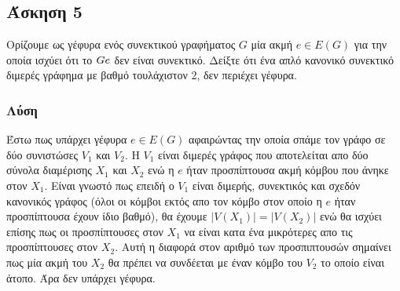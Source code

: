 \newpage\subsection*{Άσκηση 5}

Ορίζουμε ως γέφυρα ενός συνεκτικού γραφήματος $G$ μία ακμή $e \in E(G)$ για την οποία ισχύει ότι 
το $G\\e$ δεν είναι συνεκτικό. Δείξτε ότι ένα απλό κανονικό συνεκτικό διμερές γράφημα με βαθμό τουλάχιστον
2, δεν περιέχει γέφυρα.

\subsubsection*{Λύση}

Έστω πως υπάρχει γέφυρα $e \in E(G)$ αφαιρώντας την οποία σπάμε τον γράφο σε δύο συνιστώσες $V_1$ και $V_2$.
Η $V_1$ είναι διμερές γράφος που αποτελείται απο δύο σύνολα διαμέρισης $X_1$ και $X_2$ ενώ η $e$ ήταν προσπίπτουσα
ακμή κόμβου που άνηκε στον $X_1$. Είναι γνωστό πως επειδή ο $V_1$ 
είναι διμερής, συνεκτικός και σχεδόν κανονικός γράφος (όλοι οι κόμβοι εκτός απο τον κόμβο στον οποίο η $e$ ήταν προσπίπτουσα έχουν ίδιο βαθμό), 
θα έχουμε $|V(X_1)| = |V(X_2)|$ ενώ θα ισχύει επίσης πως οι προσπίπτουσες στον $X_1$ να είναι κατα ένα μικρότερες απο τις προσπίπτουσες στον $X_2$. Αυτή η διαφορά στον αριθμό
των προσπιπτουσών σημαίνει πως μία ακμή του $X_2$ θα πρέπει να συνδέεται με έναν κόμβο του $V_2$ το οποίο είναι άτοπο. Άρα δεν υπάρχει γέφυρα.
